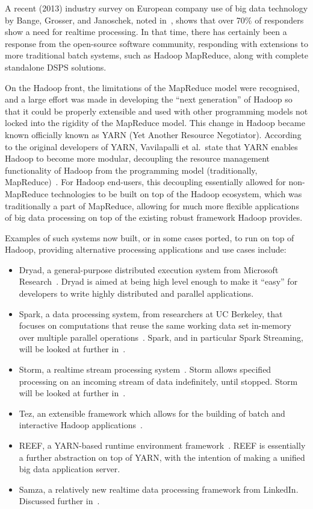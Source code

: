 A recent (2013) industry survey on European company use of big data technology by Bange, Grosser, and Janoschek, noted
in~\cite{industry_bd_survey}, shows that over 70\% of responders show a need for realtime processing. In that time,
there has certainly been a response from the open-source software community, responding with extensions to more
traditional batch systems, such as Hadoop MapReduce, along with complete standalone DSPS solutions.

On the Hadoop front, the limitations of the MapReduce model were recognised, and a large effort was made in developing
the ``next generation'' of Hadoop so that it could be properly extensible and used with other programming models not locked into
the rigidity of the MapReduce model. This change in Hadoop became known officially known as YARN (Yet Another Resource Negotiator). According to
the original developers of YARN, Vavilapalli et al.\ state that YARN enables Hadoop to become more modular, decoupling
the resource management functionality of Hadoop from the programming model (traditionally,
MapReduce)~\cite{vavilapalli2013apache}.
For Hadoop end-users, this decoupling essentially allowed for non-MapReduce technologies to be built on top of the Hadoop
ecosystem, which was traditionally a part of MapReduce, allowing for much more flexible applications of big data
processing on top of the existing robust framework Hadoop provides.

Examples of such systems now built, or in some cases ported, to run on top of Hadoop, providing alternative processing
applications and use cases include:

\begin{itemize}
  \item Dryad, a general-purpose distributed execution system from Microsoft Research~\cite{isard2007dryad}. Dryad is
  aimed at being high level enough to make it ``easy'' for developers to write highly distributed and parallel applications.
  \item Spark, a data processing system, from researchers at UC Berkeley, that focuses on computations that reuse the
  same working data set in-memory over multiple parallel operations~\cite{zaharia2010spark}. Spark, and in particular Spark
  Streaming, will be looked at further in~.
  \item Storm, a realtime stream processing system~\cite[p.\ 244]{murthy2013apache}. Storm allows specified processing
  on an incoming stream of data indefinitely, until stopped. Storm will be looked at further in~.
  \item Tez, an extensible framework which allows for the building of batch and interactive Hadoop
  applications~\cite{web_tez}.
  \item REEF, a YARN-based runtime environment framework~\cite{chun2013reef}. REEF is essentially a further abstraction
  on top of YARN, with the intention of making a unified big data application server.
  \item Samza, a relatively new realtime data processing framework from LinkedIn. Discussed further in~.
\end{itemize}

